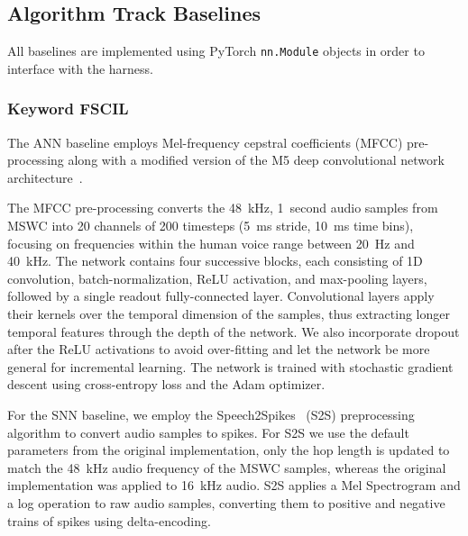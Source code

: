 \subsection*{Algorithm Track Baselines}

All baselines are implemented using PyTorch \texttt{nn.Module} objects in order to interface with the harness.

\subsubsection*{Keyword FSCIL}

The ANN baseline employs Mel-frequency cepstral coefficients (MFCC) pre-processing along with a modified version of the M5 deep convolutional network architecture~\cite{dai2016deep}. 

The MFCC pre-processing converts the 48~kHz, 1~second audio samples from MSWC into 20 channels of 200 timesteps (5~ms stride, 10~ms time bins), focusing on frequencies within the human voice range between 20~Hz and 40~kHz.
The network contains four successive blocks, each consisting of 1D convolution, batch-normalization, ReLU activation, and max-pooling layers, followed by a single readout fully-connected layer. Convolutional layers apply their kernels over the temporal dimension of the samples, thus extracting longer temporal features through the depth of the network. 
We also incorporate dropout after the ReLU activations to avoid over-fitting and let the network be more general for incremental learning. 
The network is trained with stochastic gradient descent using cross-entropy loss and the Adam optimizer.


For the SNN baseline, we employ the Speech2Spikes~\cite{stewart23speech2spikes} (S2S) preprocessing algorithm to convert audio samples to spikes.
For S2S we use the default parameters from the original implementation, only the hop length is updated to match the 48~kHz audio frequency of the MSWC samples, whereas the original implementation was applied to 16~kHz audio. S2S applies a Mel Spectrogram and a log operation to raw audio samples, converting them to positive and negative trains of spikes using delta-encoding.


